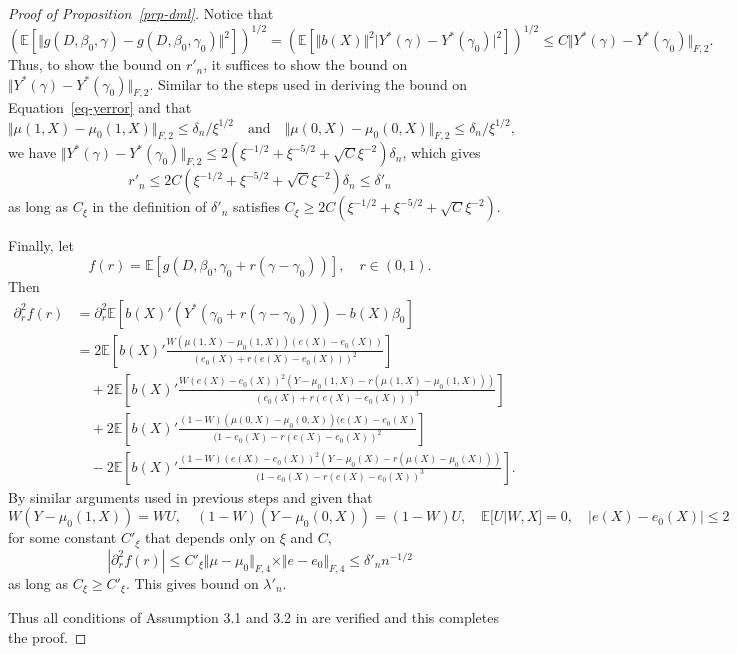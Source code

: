 \documentclass[
  12pt,
  12pt]{article}
\numberwithin{equation}{section}
\theoremstyle{definition}
\theoremstyle{plain}
\theoremstyle{plain}
\theoremstyle{remark}
\begin{document}
\begin{proof}[Proof of Proposition~\ref{prp-dml}]
Notice that \[
(\mathbb{E}[\Vert g(D, \beta_0, \gamma) - g(D, \beta_0, \gamma_0) \Vert^2])^{1/2} = (\mathbb{E}[\Vert b(X) \Vert^2 \vert Y^*(\gamma) - Y^*(\gamma_0) \vert^2])^{1/2} \leqslant C \Vert Y^*(\gamma) - Y^*(\gamma_0) \Vert_{F, 2}.
\] Thus, to show the bound on \(r'_n\), it suffices to show the bound on
\(\Vert Y^*(\gamma) - Y^*(\gamma_0) \Vert_{F, 2}\). Similar to the steps
used in deriving the bound on Equation~\ref{eq-yerror} and that \[
\Vert \mu(1, X) - \mu_0(1, X) \Vert_{F, 2} \leqslant \delta_n/\xi^{1/2} \quad \text{and} \quad \Vert \mu(0, X) - \mu_0(0, X) \Vert_{F, 2} \leqslant \delta_n/\xi^{1/2},
\] we have
\(\Vert Y^*(\gamma) - Y^*(\gamma_0) \Vert_{F, 2} \leqslant 2(\xi^{-1/2} + \xi^{-5/2} + \sqrt{C}\xi^{-2})\delta_n\),
which gives \[
r'_n \leqslant 2C(\xi^{-1/2} + \xi^{-5/2} + \sqrt{C}\xi^{-2})\delta_n \leqslant \delta'_n
\] as long as \(C_\xi\) in the definition of \(\delta'_n\) satisfies
\(C_\xi \geqslant 2C(\xi^{-1/2} + \xi^{-5/2} + \sqrt{C}\xi^{-2})\).

Finally, let \[
f(r) = \mathbb{E}[g(D, \beta_0, \gamma_0 + r(\gamma - \gamma_0))], \quad r \in (0, 1).
\] Then \[
\begin{aligned}
\partial^2_r f(r) &= \partial_r^2 \mathbb{E}[b(X)'(Y^*(\gamma_0 + r(\gamma - \gamma_0))) - b(X)\beta_0] \\
&= 2\mathbb{E}\left[b(X)'\frac{W(\mu(1, X) - \mu_0(1, X))(e(X) - e_0(X))}{(e_0(X) + r(e(X) - e_0(X)))^2}\right] \\
&\quad + 2\mathbb{E}\left[b(X)'\frac{W(e(X) - e_0(X))^2(Y - \mu_0(1, X) - r(\mu(1, X) - \mu_0(1, X)))}{(e_0(X) + r(e(X) - e_0(X)))^3}\right] \\
&\quad + 2\mathbb{E}\left[b(X)'\frac{(1 - W)(\mu(0, X) - \mu_0(0, X))(e(X) - e_0(X)}{(1 - e_0(X) - r(e(X) - e_0(X))^2}\right] \\
&\quad - 2\mathbb{E}\left[b(X)'\frac{(1 - W)(e(X) - e_0(X))^2(Y - \mu_0(X) - r(\mu(X) - \mu_0(X)))}{(1 - e_0(X) - r(e(X) - e_0(X))^3}\right].
\end{aligned}
\] By similar arguments used in previous steps and given that \[
W(Y - \mu_0(1 , X)) = WU, \quad (1 - W)(Y - \mu_0(0, X)) = (1 - W)U, \quad \mathbb{E}[U|W, X] = 0, \quad |e(X) - e_0(X)| \leqslant 2
\] for some constant \(C'_\xi\) that depends only on \(\xi\) and \(C\),
\[
|\partial^2_r f(r)| \leqslant C'_\xi \Vert \mu - \mu_0 \Vert_{F, 4} \times \Vert e - e_0 \Vert_{F, 4} \leqslant \delta'_nn^{-1/2}
\] as long as \(C_\xi \geqslant C'_\xi\). This gives bound on
\(\lambda'_n\).

Thus all conditions of Assumption 3.1 and 3.2 in
\citet{chernozhukov2018double} are verified and this completes the
proof.
\end{proof}
\end{document}
